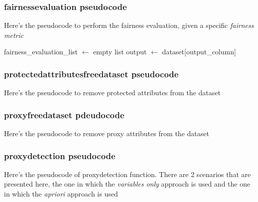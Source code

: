 \documentclass[12pt,a4paper,openright,twoside]{book}
\begin{document}
\subsubsection{fairness\textunderscore evaluation pseudocode}
Here's the pseudocode to perform the fairness evaluation, given a specific \emph{fairness metric}

\begin{algorithm}[H]
    fairness\_evaluation\_list $\gets$ empty list\;
    output $\gets$ dataset[output\_column]\;
\end{algorithm}

\subsubsection{protected\textunderscore attributes\textunderscore free\textunderscore dataset pseudocode}
Here's the pseudocode to remove protected attributes from the dataset

\begin{algorithm}[H]
\end{algorithm}

\subsubsection{proxy\textunderscore free\textunderscore dataset pdeudocode}
Here's the pseudocode to remove proxy attributes from the dataset

\begin{algorithm}[H]
\end{algorithm}

\subsubsection{proxy\textunderscore detection pseudocode}
Here's the pseudocode of proxy\textunderscore detection function. There are 2 scenarios that are presented here, the one in which the \emph{variables only}  approach is used and the one in which the \emph{apriori} approach is used
\end{document}
